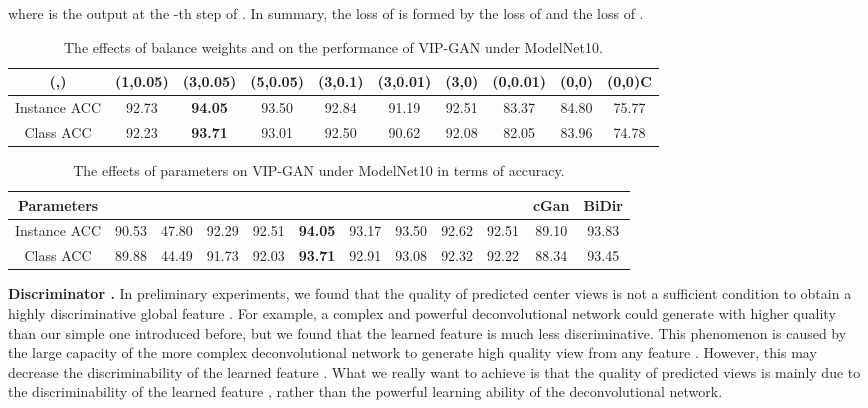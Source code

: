 \documentclass[letterpaper]{article} \usepackage{aaai19}  \usepackage{times}  \usepackage{helvet}  \usepackage{courier}  \usepackage{url}  \usepackage{graphicx}
\begin{document}
where  is the output at the -th step of .
In summary, the loss of  is formed by the loss  of  and the loss  of .

\begin{table*}[tb]
  \caption{The effects of balance weights  and  on the performance of VIP-GAN under ModelNet10.}
  \label{table:balance}
  \centering
  \begin{tabular}{c|ccccccccc}\hline
     (,) &(1,0.05)&(3,0.05)&(5,0.05)&(3,0.1)&(3,0.01)&(3,0)&(0,0.01)&(0,0)&(0,0)C\\
    \hline
     Instance ACC & 92.73 & \textbf{94.05} & 93.50 & 92.84 & 91.19 & 92.51 & 83.37 & 84.80 & 75.77
    \\
     Class ACC & 92.23 & \textbf{93.71} & 93.01 & 92.50 & 90.62 & 92.08 & 82.05 & 83.96 & 74.78
     \\
    \hline
  \end{tabular}
\end{table*}

\begin{table*}
  \caption{The effects of parameters on VIP-GAN under ModelNet10 in terms of accuracy.}
  \label{table:parameters}
  \centering
  \begin{tabular}{c|ccccccccccc}\hline
      Parameters& &&&&&&&&  &cGan&BiDir\\
    \hline
     Instance ACC&90.53&47.80& 92.29 & 92.51 & \textbf{94.05} & 93.17 & 93.50 & 92.62 & 92.51 & 89.10 & 93.83
     \\
     Class ACC& 89.88&44.49& 91.73 & 92.03 & \textbf{93.71} & 92.91 & 93.08 & 92.32 & 92.22 &88.34 & 93.45
    \\
    \hline
  \end{tabular}
\end{table*}

\noindent\textbf{Discriminator . }
In preliminary experiments, we found that the quality of predicted center views  is not a sufficient condition to obtain a highly discriminative global feature . For example, a complex and powerful deconvolutional network could generate  with higher quality than our simple one introduced before, but we found that the learned feature  is much less discriminative.
This phenomenon is caused by the large capacity of the more complex deconvolutional network to generate high quality view  from any feature . However, this may decrease the discriminability of the learned feature . What we really want to achieve is that the quality of predicted views  is mainly due to the discriminability of the learned feature , rather than the powerful learning ability of the deconvolutional network.
\end{document}
